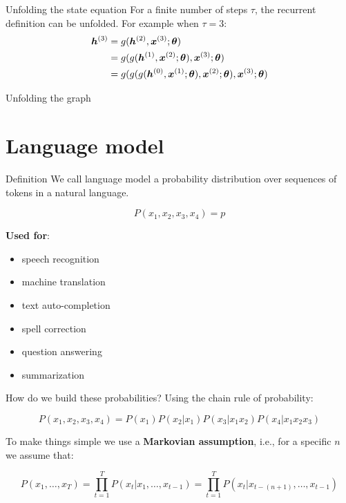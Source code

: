 \documentclass[10pt]{beamer}
\begin{document}
\begin{frame}{Unfolding the state equation}
For a finite number of steps $\tau$, the recurrent definition can be unfolded. 
For example when $\tau =3$:
\vspace{0.2cm}
\Large{
\begin{align*}
\bm{h}^{(3)}& = g(\bm{h}^{(2)}, \bm{x}^{(3)}; \bm{\theta})\\
 & = g(g(\bm{h}^{(1)}, \bm{x}^{(2)}; \bm{\theta}), \bm{x}^{(3)}; \bm{\theta})\\
 & = g(g(g(\bm{h}^{(0)}, \bm{x}^{(1)}; \bm{\theta}), \bm{x}^{(2)}; \bm{\theta}), \bm{x}^{(3)}; \bm{\theta})\\
\end{align*}
}
\end{frame}

\begin{frame}{Unfolding the graph}

\end{frame}

\section{Language model}

\begin{frame}{Definition}
We call \alert{language model} a probability distribution over sequences of tokens in a natural language.

\[
P(x_1,x_2,x_3,x_4) = p
\]

\textbf{Used for}:
\begin{itemize}
\item speech recognition
\item machine translation
\item text auto-completion
\item spell correction
\item question answering
\item summarization
\end{itemize}


\end{frame}

\begin{frame}{How do we build these probabilities?}
Using the chain rule of probability: 

\begin{equation*}
P(x_1,x_2,x_3,x_4) = P(x_1)P(x_2\vert x_1)P(x_3\vert x_1x_2)P(x_4\vert x_1x_2x_3)
\end{equation*}

\vspace{0.3cm}

To make things simple we use a \textbf{Markovian assumption}, i.e., for a specific $n$ we assume that:

\begin{equation*}
P(x_1, \dots, x_T) = \prod_{t=1}^{T} P(x_t \vert x_1, \dots, x_{t-1}) = \prod_{t=1}^{T} P(x_{t} \vert x_{t - (n+1)}, \dots, x_{t-1})
\end{equation*} 

\end{frame}
\end{document}
